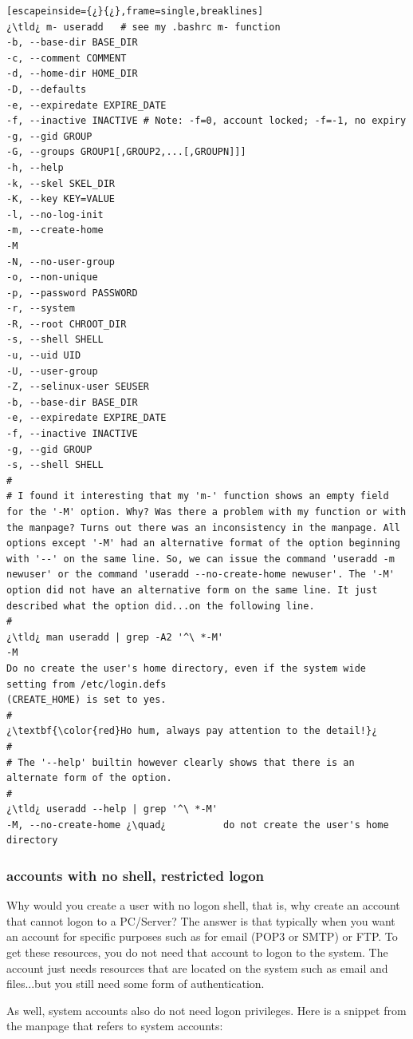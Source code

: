\begin{lstlisting}[escapeinside={¿}{¿},frame=single,breaklines]
¿\tld¿ m- useradd	# see my .bashrc m- function
-b, --base-dir BASE_DIR
-c, --comment COMMENT
-d, --home-dir HOME_DIR
-D, --defaults
-e, --expiredate EXPIRE_DATE
-f, --inactive INACTIVE # Note: -f=0, account locked; -f=-1, no expiry
-g, --gid GROUP
-G, --groups GROUP1[,GROUP2,...[,GROUPN]]]
-h, --help
-k, --skel SKEL_DIR
-K, --key KEY=VALUE
-l, --no-log-init
-m, --create-home
-M
-N, --no-user-group
-o, --non-unique
-p, --password PASSWORD
-r, --system
-R, --root CHROOT_DIR
-s, --shell SHELL
-u, --uid UID
-U, --user-group
-Z, --selinux-user SEUSER
-b, --base-dir BASE_DIR
-e, --expiredate EXPIRE_DATE
-f, --inactive INACTIVE
-g, --gid GROUP
-s, --shell SHELL
#
# I found it interesting that my 'm-' function shows an empty field for the '-M' option. Why? Was there a problem with my function or with the manpage? Turns out there was an inconsistency in the manpage. All options except '-M' had an alternative format of the option beginning with '--' on the same line. So, we can issue the command 'useradd -m newuser' or the command 'useradd --no-create-home newuser'. The '-M' option did not have an alternative form on the same line. It just described what the option did...on the following line.
#
¿\tld¿ man useradd | grep -A2 '^\ *-M'
-M
Do no create the user's home directory, even if the system wide setting from /etc/login.defs
(CREATE_HOME) is set to yes.
#
¿\textbf{\color{red}Ho hum, always pay attention to the detail!}¿
#
# The '--help' builtin however clearly shows that there is an  alternate form of the option.
#
¿\tld¿ useradd --help | grep '^\ *-M'
-M, --no-create-home ¿\quad¿          do not create the user's home directory
\end{lstlisting}

\subsubsection{accounts with no shell, restricted logon}
Why would you create a user with no logon shell, that is, why create an account that cannot logon to a PC/Server? The answer is that typically when you want an account for specific purposes such as for email (POP3 or SMTP) or FTP. To get these resources, you do not need that account to logon to the system. The account just needs resources that are located on the system such as email and files...but you still need some form of authentication. 

As well, system accounts also do not need logon privileges. Here is a snippet from the  manpage that refers to system accounts:

